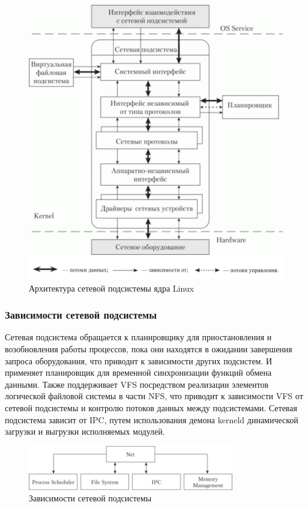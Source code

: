 \begin{figure}[h!]
	\centering
	\includegraphics[height=0.45\textheight]{img/arch_network_subsystem} %
	\caption{Архитектура сетевой подсистемы ядра Linux}
	\label{img:arch_network_subsystem}
\end{figure}

\subsubsection{Зависимости сетевой подсистемы}

Сетевая подсистема обращается к планировщику для приостановления и возобновления работы процессов, пока они находятся в ожидании завершения запроса оборудования, что приводит к зависимости других подсистем.
И применяет планировщик для временной синхронизации функций обмена данными.
Также поддерживает VFS посредством реализации элементов логической файловой системы в части NFS, что приводит к зависимости VFS от сетевой подсистемы и контролю потоков данных между подсистемами.
Сетевая подсистема зависит от IPC, путем использования демона kerneld динамической загрузки и выгрузки исполняемых модулей.

\begin{figure}[h!]
	\centering
	\includegraphics[width=0.8\textwidth]{img/depends_network_subsystem} %
	\caption{Зависимости сетевой подсистемы}
	\label{img:depends_network_subsystem}
\end{figure}


